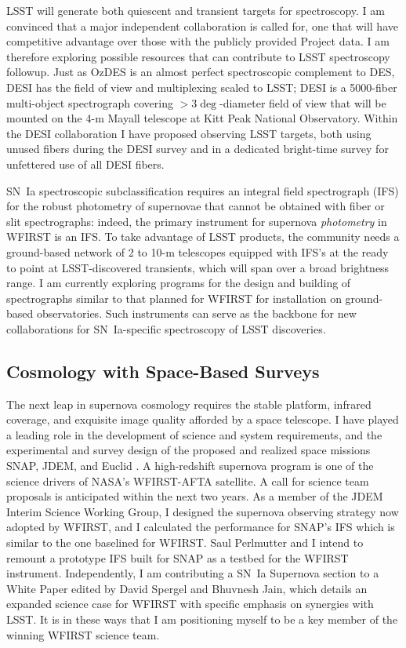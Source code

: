 \documentclass{article}
\begin{document}
LSST will generate both quiescent and transient targets for spectroscopy.  I am convinced that
a major independent collaboration is called for, one that will have competitive advantage over those with the
publicly provided Project data.
I am therefore exploring possible resources that can contribute to LSST spectroscopy followup.
Just as OzDES is an almost perfect spectroscopic complement to  DES, 
DESI has the field of view and multiplexing scaled to LSST;
DESI is a 5000-fiber multi-object spectrograph covering $>3\deg$-diameter
field of view that will be mounted on the 4-m Mayall telescope at Kitt Peak National Observatory.   Within the DESI collaboration I have proposed observing LSST targets, both using unused fibers during the
DESI survey and in a dedicated bright-time survey
for unfettered use of all DESI fibers.

SN~Ia spectroscopic subclassification requires an integral field spectrograph (IFS) for
the robust photometry of supernovae that cannot be obtained with fiber or slit spectrographs:
indeed, the primary  instrument for supernova {\it photometry} in WFIRST is an IFS.  To take
advantage of LSST products, the community needs a ground-based
network of 2 to 10-m telescopes equipped with  IFS's at the ready to
point at LSST-discovered transients, which will span over a broad  brightness range.  I am currently exploring
programs for the design and building of spectrographs similar to that planned for WFIRST for installation on ground-based
observatories.  Such instruments can serve as the backbone for
new collaborations
for SN~Ia-specific spectroscopy of LSST discoveries. 

\subsection{Cosmology with Space-Based Surveys}
The next leap in supernova cosmology requires the stable platform, infrared coverage, and exquisite image
quality afforded by a space telescope.  I have played a leading role in the development
of science and system requirements, and the experimental and survey design of the proposed
and realized space missions SNAP, JDEM, and Euclid
\cite{2006PASP..118..205D, 2011PASP..123..470S, 2013Fourspring, 2014arXiv1409.8562A}.
A  high-redshift supernova program is one of the science 
drivers of
NASA's WFIRST-AFTA satellite.  A call for science team
proposals is anticipated  within the next two years.  As a member of the JDEM Interim Science Working Group, I designed the
supernova observing strategy now adopted by WFIRST, and I calculated the performance for SNAP's IFS which is similar to the one baselined for WFIRST.  Saul Perlmutter and I intend
to remount a prototype IFS built for SNAP as a testbed for
the WFIRST instrument.  Independently, I am contributing a SN~Ia Supernova section to a White Paper 
edited by David Spergel and Bhuvnesh
Jain, which details an expanded science case for WFIRST with specific emphasis
on synergies with LSST.  It is in these ways that I am positioning myself to be a key member of the winning WFIRST science
team.
\end{document}
